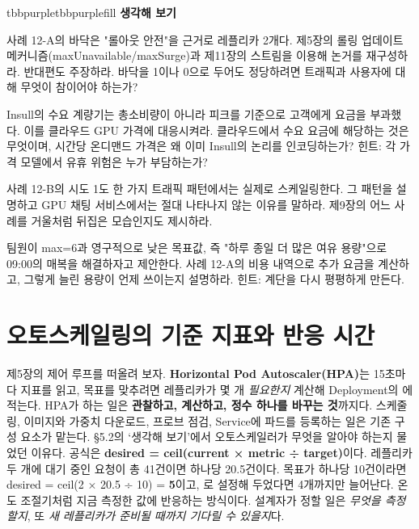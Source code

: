 \begin{calloutbox}{tbbpurple}{tbbpurplefill}
{\normalsize\bfseries\color{tbbpurple}생각해 보기}\par\vspace{3pt}
\begin{tbbitemize}
  \item 사례 12-A의 바닥은 "롤아웃 안전"을 근거로 레플리카 2개다. 제5장의 롤링 업데이트 메커니즘(maxUnavailable/maxSurge)과 제11장의 스트림을 이용해 논거를 재구성하라. 반대편도 주장하라. 바닥을 1이나 0으로 두어도 정당하려면 트래픽과 사용자에 대해 무엇이 참이어야 하는가?
  \item Insull의 수요 계량기는 총소비량이 아니라 피크를 기준으로 고객에게 요금을 부과했다. 이를 클라우드 GPU 가격에 대응시켜라. 클라우드에서 수요 요금에 해당하는 것은 무엇이며, 시간당 온디맨드 가격은 왜 이미 Insull의 논리를 인코딩하는가? 힌트: 각 가격 모델에서 유휴 위험은 누가 부담하는가?
  \item 사례 12-B의 시도 1도 한 가지 트래픽 패턴에서는 실제로 스케일링한다. 그 패턴을 설명하고 GPU 채팅 서비스에서는 절대 나타나지 않는 이유를 말하라. 제9장의 어느 사례를 거울처럼 뒤집은 모습인지도 제시하라.
  \item 팀원이 max=6과 영구적으로 낮은 목표값, 즉 "하루 종일 더 많은 여유 용량"으로 09:00의 매복을 해결하자고 제안한다. 사례 12-A의 비용 내역으로 추가 요금을 계산하고, 그렇게 늘린 용량이 언제 쓰이는지 설명하라. 힌트: 계단을 다시 평평하게 만든다.
\end{tbbitemize}
\end{calloutbox}

\section{오토스케일링의 기준 지표와 반응 시간}

제5장의 제어 루프를 떠올려 보자. \textbf{Horizontal Pod Autoscaler(HPA)}는 15초마다 지표를 읽고, 목표를 맞추려면 레플리카가 몇 개 \textit{필요한지} 계산해 Deployment의 에 적는다. HPA가 하는 일은 \textbf{관찰하고, 계산하고, 정수 하나를 바꾸는 것}까지다. 스케줄링, 이미지와 가중치 다운로드, 프로브 점검, Service에 파드를 등록하는 일은 기존 구성 요소가 맡는다. §5.2의 ‘생각해 보기’에서 오토스케일러가 무엇을 알아야 하는지 물었던 이유다. 공식은 \textbf{desired = ceil(current × metric ÷ target)}이다. 레플리카 두 개에 대기 중인 요청이 총 41건이면 하나당 20.5건이다. 목표가 하나당 10건이라면 desired = ceil(2 × 20.5 ÷ 10) = \textbf{5}이고, 로 설정해 두었다면 4개까지만 늘어난다. 온도 조절기처럼 지금 측정한 값에 반응하는 방식이다. 설계자가 정할 일은 \textit{무엇을 측정할지}, 또 \textit{새 레플리카가 준비될 때까지 기다릴 수 있을지}다.

